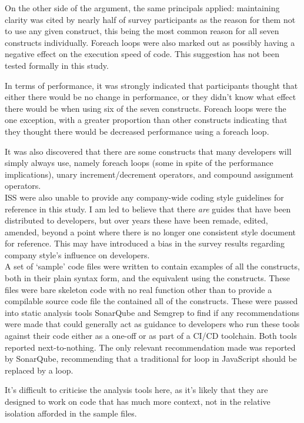 \documentclass{article}
\begin{document}
            On the other side of the argument, the same principals applied: maintaining clarity was cited by nearly half of survey participants as the reason for them not to use any given construct, this being the most common reason for all seven constructs individually. Foreach loops were also marked out as possibly having a negative effect on the execution speed of code. This suggestion has not been tested formally in this study.

            In terms of performance, it was strongly indicated that participants thought that either there would be no change in performance, or they didn't know what effect there would be when using six of the seven constructs. Foreach loops were the one exception, with a greater proportion than other constructs indicating that they thought there would be decreased performance using a foreach loop.

            It was also discovered that there are some constructs that many developers will simply always use, namely foreach loops (some in spite of the performance implications), unary increment/decrement operators, and compound assignment operators.
            \\
            ISS were also unable to provide any company-wide coding style guidelines for reference in this study. I am led to believe that there \emph{are} guides that have been distributed to developers, but over years these have been remade, edited, amended, beyond a point where there is no longer one consistent style document for reference. This may have introduced a bias in the survey results regarding company style's influence on developers.
            \\

            A set of `sample' code files were written to contain examples of all the constructs, both in their plain syntax form, and the equivalent using the constructs. These files were bare skeleton code with no real function other than to provide a compilable source code file the contained all of the constructs. These were passed into static analysis tools SonarQube and Semgrep to find if any recommendations were made that could generally act as guidance to developers who run these tools against their code either as a one-off or as part of a CI/CD toolchain. Both tools reported next-to-nothing. The only relevant recommendation made was reported by SonarQube, recommending that a traditional for loop in JavaScript should be replaced by a  loop.

            It's difficult to criticise the analysis tools here, as it's likely that they are designed to work on code that has much more context, not in the relative isolation afforded in the sample files.
\end{document}
